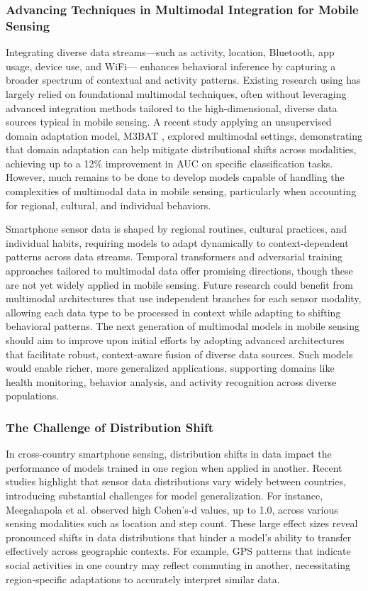 \subsubsection{Advancing Techniques in Multimodal Integration for Mobile Sensing}

Integrating diverse data streams—such as activity, location, Bluetooth, app usage, device use, and WiFi— enhances behavioral inference by capturing a broader spectrum of contextual and activity patterns. Existing research using \dataset has largely relied on foundational multimodal techniques, often without leveraging advanced integration methods tailored to the high-dimensional, diverse data sources typical in mobile sensing. A recent study applying an unsupervised domain adaptation model, M3BAT \cite{meegahapola2024m3bat}, explored multimodal settings, demonstrating that domain adaptation can help mitigate distributional shifts across modalities, achieving up to a 12\% improvement in AUC on specific classification tasks. However, much remains to be done to develop models capable of handling the complexities of multimodal data in mobile sensing, particularly when accounting for regional, cultural, and individual behaviors.

Smartphone sensor data is shaped by regional routines, cultural practices, and individual habits, requiring models to adapt dynamically to context-dependent patterns across data streams. Temporal transformers and adversarial training approaches tailored to multimodal data offer promising directions, though these are not yet widely applied in mobile sensing. Future research could benefit from multimodal architectures that use independent branches for each sensor modality, allowing each data type to be processed in context while adapting to shifting behavioral patterns. The next generation of multimodal models in mobile sensing should aim to improve upon initial efforts by adopting advanced architectures that facilitate robust, context-aware fusion of diverse data sources. Such models would enable richer, more generalized applications, supporting domains like health monitoring, behavior analysis, and activity recognition across diverse populations.


\subsubsection{The Challenge of Distribution Shift}

In cross-country smartphone sensing, distribution shifts in data impact the performance of models trained in one region when applied in another. Recent studies highlight that sensor data distributions vary widely between countries, introducing substantial challenges for model generalization. For instance, Meegahapola et al. \cite{meegahapola2024m3bat} observed high Cohen’s-d values, up to 1.0, across various sensing modalities such as location and step count. These large effect sizes reveal pronounced shifts in data distributions that hinder a model's ability to transfer effectively across geographic contexts. For example, GPS patterns that indicate social activities in one country may reflect commuting in another, necessitating region-specific adaptations to accurately interpret similar data.

